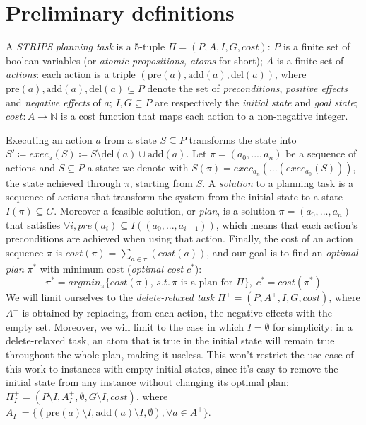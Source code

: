 \section{Preliminary definitions}
A \textit{STRIPS} \cite{Fikes_71} \textit{planning task} is a 5-tuple $\Pi=(P,A,I,G,cost)$: $P$ is a finite set of boolean variables (or \textit{atomic propositions, atoms} for short); $A$ is a finite set of \textit{actions}: each action is a triple $(\mbox{pre}(a), \mbox{add}(a), \mbox{del}(a))$, where $\mbox{pre}(a),\mbox{add}(a),\mbox{del}(a)\subseteq P$ denote the set of \textit{preconditions}, \textit{positive effects} and \textit{negative effects} of $a$; $I,G\subseteq P$ are respectively the \textit{initial state} and \textit{goal state}; $cost:A\to\mathbb{N}$ is a cost function that maps each action to a non-negative integer.

Executing an action $a$ from a state $S\subseteq P$ transforms the state into $S'\coloneq exec_a(S)\coloneq S\setminus \mbox{del}(a)\cup \mbox{add}(a)$.
Let $\pi=(a_0,...,a_n)$ be a sequence of actions and $S\subseteq P$ a state: we denote with $S(\pi)=exec_{a_n}(...(exec_{a_0}(S)))$, the state achieved through $\pi$, starting from $S$.
A \textit{solution} to a planning task is a sequence of actions that transform the system from the initial state to a state $I(\pi)\subseteq G$. Moreover a feasible solution, or \textit{plan}, is a solution $\pi=(a_0,...,a_n)$ that satisfies $\forall i,pre(a_i)\subseteq I((a_0,...,a_{i-1}))$, which means that each action's preconditions are achieved when using that action. Finally, the cost of an action sequence $\pi$ is $cost(\pi)=\sum_{a\in\pi}(cost(a))$, and our goal is to find an \textit{optimal plan} $\pi^*$ with minimum cost (\textit{optimal cost} $c^*$): $$\pi^*=argmin_{\pi}\{{cost(\pi)},\,s.t.\,\pi\mbox{ is a plan for }\Pi\},\;c^*=cost(\pi^*)$$
We will limit ourselves to the \textit{delete-relaxed task} $\Pi^+=(P,A^+,I,G,cost)$, where $A^+$ is obtained by replacing, from each action, the negative effects with the empty set. Moreover, we will limit to the case in which $I=\emptyset$ for simplicity: in a delete-relaxed task, an atom that is true in the initial state will remain true throughout the whole plan, making it useless. This won't restrict the use case of this work to instances with empty initial states, since it's easy to remove the initial state from any instance without changing its optimal plan: $\Pi^+_I=(P\setminus I, A^+_{I}, \emptyset, G\setminus I, cost)$, where $A^+_I=\{(\mbox{pre}(a)\setminus I, \mbox{add}(a)\setminus I, \emptyset),\forall a\in A^+\}$.
